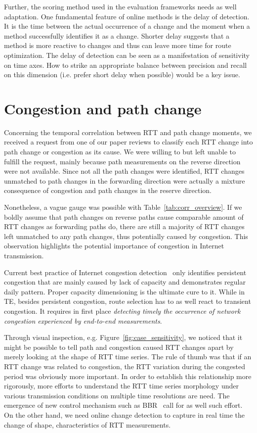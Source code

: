 Further, the scoring method used in the evaluation frameworks needs as well adaptation.
One fundamental feature of online methods is the delay of detection. It is the time between the actual occurrence of a change and the moment when a method successfully identifies it as a change. Shorter delay suggests that a method is more reactive to changes and thus can leave more time for route optimization. The delay of detection can be seen as a manifestation of sensitivity on time axes. How to strike an appropriate balance between precision and recall on this dimension (i.e. prefer short delay when possible) would be a key issue.

\section{Congestion and path change}
Concerning the temporal correlation between RTT and path change moments, we received a request from one of our paper reviews to classify each RTT change into path change or congestion as its cause. We were willing to but left unable to fulfill the request,  mainly because path measurements on the reverse direction were not available. Since not all the path changes were identified, RTT changes unmatched to path changes in the forwarding direction were actually a mixture consequence of congestion and path changes in the reserve direction.

Nonetheless, a vague gauge was possible with Table~\ref{tab:corr_overview}.
If we boldly assume that path changes on reverse paths cause comparable amount of RTT changes as forwarding paths do, there are still a majority of RTT changes left unmatched to any path changes, thus potentially caused by congestion. 
This observation highlights the potential importance of congestion in Internet transmission.

Current best practice of Internet congestion detection~\cite{Luckie2014} only identifies persistent congestion that are mainly caused by lack of capacity and demonstrates regular daily pattern. Proper capacity dimensioning is the ultimate cure to it. While in TE, besides persistent congestion, route selection has to as well react to transient congestion.
It requires in first place \textit{detecting timely the occurrence of network congestion experienced by end-to-end measurements}.

Through visual inspection, e.g. Figure~\ref{fig:case_sensitivity}, we noticed that it might be possible to tell path and congestion caused RTT changes apart by merely looking at the shape of RTT time series. The rule of thumb was that if an RTT change was related to congestion, the RTT variation during the congested period was obviously more important. In order to establish this relationship more rigorously, more efforts to understand the RTT time series morphology under various transmission conditions on multiple time resolutions are need.
The emergence of new control mechanism such as BBR~\cite{Cardwell2016, quic_cc} call for as well such effort.
On the other hand, we need online change detection to capture in real time the change of shape, characteristics of RTT measurements.


